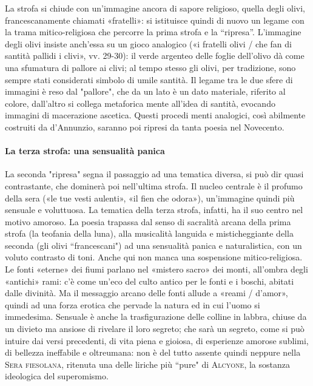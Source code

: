\documentclass{book}
\begin{document}
La strofa si chiude con un'immagine ancora di sapore religioso, quella degli olivi, francescanamente chiamati «fratelli»: si istituisce quindi di nuovo un legame con la trama mitico-religiosa che percorre la prima strofa e la “ripresa”. L'immagine degli olivi insiste anch'essa su un gioco analogico («i fratelli olivi / che fan di santità pallidi i clivi», vv. 29-30): il verde argenteo delle foglie dell'olivo dà come una sfumatura di pallore ai clivi; al tempo stesso gli olivi, per tradizione, sono sempre stati considerati simbolo di umile santità. Il legame tra le due sfere di immagini è reso dal "pallore", che da un lato è un dato materiale, riferito al colore, dall'altro si collega metaforica mente all'idea di santità, evocando immagini di macerazione ascetica. Questi procedi menti analogici, così abilmente costruiti da d'Annunzio, saranno poi ripresi da tanta poesia nel Novecento.

\paragraph{La terza strofa: una sensualità panica}

La seconda "ripresa" segna il passaggio ad una tematica diversa, si può dir quasi contrastante, che dominerà poi nell'ultima strofa. Il nucleo centrale è il profumo della sera («le tue vesti aulenti», «il fien che odora»), un'immagine quindi più sensuale e voluttuosa. La tematica della terza strofa, infatti, ha il suo centro nel motivo amoroso. La poesia trapassa dal senso di sacralità arcana della prima strofa (la teofania della luna), alla musicalità languida e misticheggiante della seconda (gli olivi “francescani") ad una sensualità panica e naturalistica, con un voluto contrasto di toni. Anche qui non manca una sospensione mitico-religiosa. Le fonti «eterne» dei fiumi parlano nel «mistero sacro» dei monti, all'ombra degli «antichi» rami: c'è come un'eco del culto antico per le fonti e i boschi, abitati dalle divinità. Ma il messaggio arcano delle fonti allude a «reami / d'amor», quindi ad una forza erotica che pervade la natura ed in cui l'uomo si immedesima. Sensuale è anche la trasfigurazione delle colline in labbra, chiuse da un divieto ma ansiose di rivelare il loro segreto; che sarà un segreto, come si può intuire dai versi precedenti, di vita piena e gioiosa, di esperienze amorose sublimi, di bellezza ineffabile e oltreumana: non è del tutto assente quindi neppure nella \textsc{Sera fiesolana}, ritenuta una delle liriche più “pure" di \textsc{Alcyone}, la sostanza ideologica del superomismo.
\end{document}
